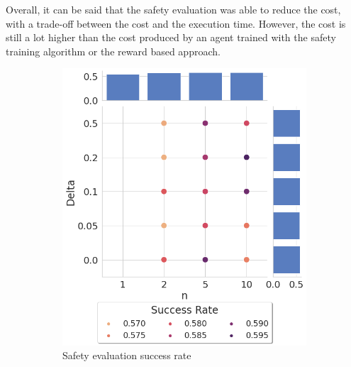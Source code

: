 Overall, it can be said that the safety evaluation was able to reduce the cost, with a trade-off between the cost and the execution time. However, the cost is still a lot higher than the cost produced by an agent trained with the safety training algorithm or the reward based approach.

\begin{figure}
    \centering
    \begin{subfigure}[b]{.49\textwidth}
    \centering
    \includegraphics[width=\textwidth]{images/results/push-barrier-state/safety_eval_success.png}
    \caption{Safety evaluation success rate}
    \label{fig:results:barrier-state-safety-eval-success}
    \end{subfigure}
    \hfill
    \begin{subfigure}[b]{.49\textwidth}
    \centering

\end{subfigure}
\end{figure}
